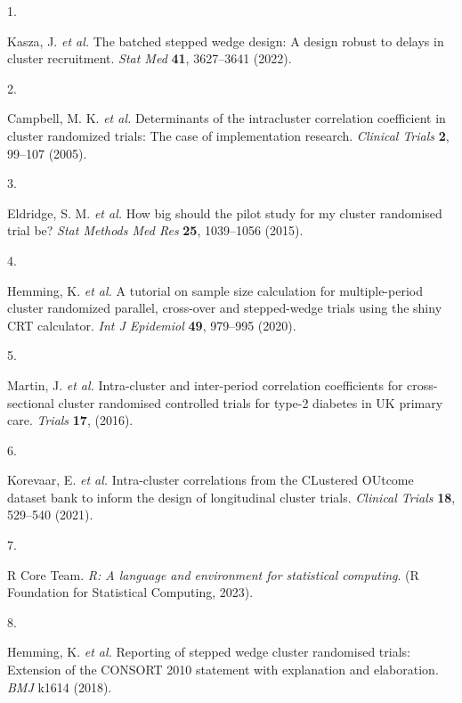 \documentclass[
]{scrartcl}
\newlength{\cslhangindent}
\newlength{\csllabelwidth}
\newlength{\cslentryspacingunit} %
\newenvironment{CSLReferences}[2] %
 {%
  \setlength{\parindent}{0pt}
  \ifodd #1
  \let\oldpar\par
  \def\par{\hangindent=\cslhangindent\oldpar}
  \fi
  \setlength{\parskip}{#2\cslentryspacingunit}
 }%
 {}
\newcommand{\CSLLeftMargin}[1]{\parbox[t]{\csllabelwidth}{#1}}
\newcommand{\CSLRightInline}[1]{\parbox[t]{\linewidth - \csllabelwidth}{#1}\break}
\begin{document}
\hypertarget{refs}{}
\begin{CSLReferences}{0}{0}
\leavevmode{}%
\CSLLeftMargin{1. }%
\CSLRightInline{Kasza, J. \emph{et al.} The batched stepped wedge
design: A design robust to delays in cluster recruitment. \emph{Stat
Med} \textbf{41}, 3627--3641 (2022).}

\leavevmode{}%
\CSLLeftMargin{2. }%
\CSLRightInline{Campbell, M. K. \emph{et al.} Determinants of the
intracluster correlation coefficient in cluster randomized trials: The
case of implementation research. \emph{Clinical Trials} \textbf{2},
99--107 (2005).}

\leavevmode{}%
\CSLLeftMargin{3. }%
\CSLRightInline{Eldridge, S. M. \emph{et al.} How big should the pilot
study for my cluster randomised trial be? \emph{Stat Methods Med Res}
\textbf{25}, 1039--1056 (2015).}

\leavevmode{}%
\CSLLeftMargin{4. }%
\CSLRightInline{Hemming, K. \emph{et al.} A tutorial on sample size
calculation for multiple-period cluster randomized parallel, cross-over
and stepped-wedge trials using the shiny CRT calculator. \emph{Int J
Epidemiol} \textbf{49}, 979--995 (2020).}

\leavevmode{}%
\CSLLeftMargin{5. }%
\CSLRightInline{Martin, J. \emph{et al.} Intra-cluster and inter-period
correlation coefficients for cross-sectional cluster randomised
controlled trials for type-2 diabetes in UK primary care. \emph{Trials}
\textbf{17}, (2016).}

\leavevmode{}%
\CSLLeftMargin{6. }%
\CSLRightInline{Korevaar, E. \emph{et al.} Intra-cluster correlations
from the CLustered OUtcome dataset bank to inform the design of
longitudinal cluster trials. \emph{Clinical Trials} \textbf{18},
529--540 (2021).}

\leavevmode{}%
\CSLLeftMargin{7. }%
\CSLRightInline{R Core Team. \emph{R: A language and environment for
statistical computing}. (R Foundation for Statistical Computing, 2023).}

\leavevmode{}%
\CSLLeftMargin{8. }%
\CSLRightInline{Hemming, K. \emph{et al.} Reporting of stepped wedge
cluster randomised trials: Extension of the CONSORT 2010 statement with
explanation and elaboration. \emph{BMJ} k1614 (2018).}


\end{CSLReferences}
\end{document}
